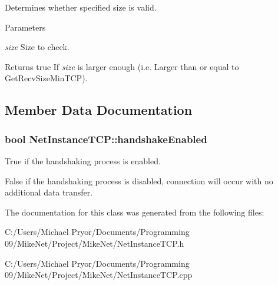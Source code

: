 Determines whether specified size is valid. 


\begin{DoxyParams}{Parameters}
\item[{\em size}]Size to check. \end{DoxyParams}
\begin{DoxyReturn}{Returns}
true If {\itshape size\/} is larger enough (i.e. Larger than or equal to GetRecvSizeMinTCP). 
\end{DoxyReturn}


\subsection{Member Data Documentation}
\hypertarget{class_net_instance_t_c_p_af13f96901d3006beeda0c161f32cbfde}{
\subsubsection[{handshakeEnabled}]{\setlength{\rightskip}{0pt plus 5cm}bool {\bf NetInstanceTCP::handshakeEnabled}}}
\label{class_net_instance_t_c_p_af13f96901d3006beeda0c161f32cbfde}


True if the handshaking process is enabled. 

False if the handshaking process is disabled, connection will occur with no additional data transfer. 

The documentation for this class was generated from the following files:\begin{DoxyCompactItemize}
\item 
C:/Users/Michael Pryor/Documents/Programming 09/MikeNet/Project/MikeNet/NetInstanceTCP.h\item 
C:/Users/Michael Pryor/Documents/Programming 09/MikeNet/Project/MikeNet/NetInstanceTCP.cpp\end{DoxyCompactItemize}
